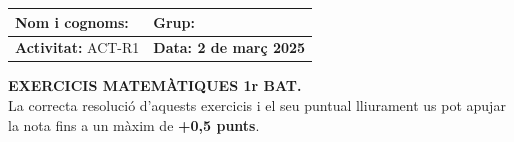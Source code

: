 \documentclass[12pt,a4paper]{article}
\begin{document}
\begingroup
\renewcommand{\arraystretch}{2.2}
\begin{tabularx}{\textwidth}{|X|p{4cm}|}
    \hline
    \textbf{Nom i cognoms:} & \textbf{Grup:} \\ \hline
    \textbf{Activitat:} ACT-R1 & \textbf{Data: 2 de març 2025} \\ \hline
\end{tabularx}
\endgroup

\vspace{0.5cm}

\begin{center}
    {\Large \textbf{EXERCICIS MATEMÀTIQUES 1r BAT.}}\\[0.3em]
    {\normalsize La correcta resolució d'aquests exercicis i el seu puntual lliurament us pot apujar la nota fins a un màxim de \textbf{+0{,}5 punts}.}
\end{center}

\vspace{0.3cm}
\end{document}
